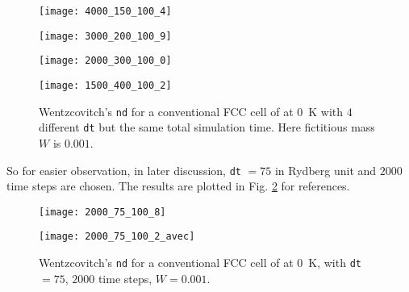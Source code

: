 \begin{figure}[h]
	\centering
	\begin{minipage}[t]{0.48\textwidth}
		\centering
		\texttt{[image: 4000\_150\_100\_4]}
		\label{fig:inp1:mini:subfig:a}   %
	\end{minipage}
	\hfill
	\begin{minipage}[t]{0.48\textwidth}
		\centering
		\texttt{[image: 3000\_200\_100\_9]}
		\label{fig:inp1:mini:subfig:b}   %
	\end{minipage}
	\begin{minipage}[t]{0.48\textwidth}
		\centering
		\texttt{[image: 2000\_300\_100\_0]}
		\label{fig:inp1:mini:subfig:c}   %
	\end{minipage}
	\hfill
	\begin{minipage}[t]{0.48\textwidth}
		\centering
		\texttt{[image: 1500\_400\_100\_2]}
		\label{fig:inp1:mini:subfig:d}   %
	\end{minipage}
	\caption{Wentzcovitch's \texttt{nd} for a conventional FCC cell of  at \SI{0}{\kelvin} with $4$ different \texttt{dt} but the same total simulation time. Here fictitious mass $W$ is $0.001$.}
	\label{fig:inp1}   %
\end{figure}

So for easier observation,
in later discussion, \texttt{dt} $= 75$ in Rydberg unit and $2000$ time steps are chosen.
The results are plotted in Fig. \ref{fig:inp1run} for references.

\begin{figure}[h]
	\begin{minipage}[t]{0.48\textwidth}
		\centering
		\texttt{[image: 2000\_75\_100\_8]}
		\label{fig:inp1run:mini:subfig:a}   %
	\end{minipage}
	\hfill
	\begin{minipage}[t]{0.48\textwidth}
		\centering
		\texttt{[image: 2000\_75\_100\_2\_avec]}
		\label{fig:inp1run:mini:subfig:b}   %
	\end{minipage}
	\caption{Wentzcovitch's \texttt{nd} for a conventional FCC cell of  at \SI{0}{\kelvin}, with \texttt{dt} $=75$, $2000$ time steps, $W = 0.001$.}
	\label{fig:inp1run}   %
\end{figure}

